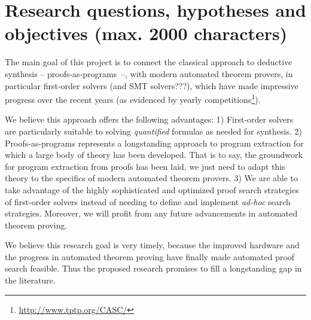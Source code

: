 \documentclass[a4paper,12pt]{article}
\begin{document}
\section{Research questions, hypotheses and objectives (max. 2000 characters)}

The main goal of this project is to connect the classical approach to deductive synthesis --  proofs-as-programs~\cite{?}--, with modern automated theorem provers, in particular first-order solvers (and SMT solvers???), which have made impressive progress over the recent years (as evidenced by yearly competitions\footnote{\url{http://www.tptp.org/CASC/}}).

We believe this approach offers the following advantages:
1) First-order solvers are particularly suitable to solving \emph{quantified} formulas as needed for synthesis.
2) Proofs-as-programs represents a longstanding approach to program extraction for which a large body of theory has been developed.
That is to say, the groundwork for program extraction from proofs has been laid, we just need to adapt this theory to the specifics of modern automated theorem provers.
3) We are able to take advantage of the highly sophisticated and optimized proof search strategies of first-order solvers instead of needing to define and implement \emph{ad-hoc} search strategies.
Moreover, we will profit from any future advancements in automated theorem proving.

We believe this research goal is very timely, because the improved hardware and the progress in automated theorem proving have finally made automated proof search feasible.
Thus the proposed research promises to fill a longstanding gap in the literature.
\end{document}
